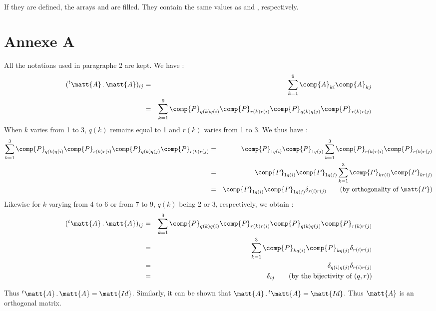 If they are defined, the arrays  and 
are filled. They contain the same values as  and
, respectively.


\section*{Annexe A}

All the notations used in paragraphe 2 are kept. We have :
\begin{eqnarray}
(^t\matt{A}\,.\,\matt{A})_{ij}
& = & \sum_{k=1}^9\comp{A}_{ki}\comp{A}_{kj}\nonumber\\
& = & \sum_{k=1}^9
\comp{P}_{q(k)q(i)}\comp{P}_{r(k)r(i)}\comp{P}_{q(k)q(j)}\comp{P}_{r(k)r(j)}
\end{eqnarray}
When $k$ varies from 1 to 3, $q(k)$ remains equal to 1 and $r(k)$ varies from 1
to 3. We thus have :
\begin{eqnarray}
\sum_{k=1}^3
\comp{P}_{q(k)q(i)}\comp{P}_{r(k)r(i)}\comp{P}_{q(k)q(j)}\comp{P}_{r(k)r(j)}
&=&\comp{P}_{1q(i)}\comp{P}_{1q(j)}\sum_{k=1}^3
\comp{P}_{r(k)r(i)}\comp{P}_{r(k)r(j)}\nonumber\\
&=&\comp{P}_{1q(i)}\comp{P}_{1q(j)}\sum_{k=1}^3
\comp{P}_{kr(i)}\comp{P}_{kr(j)}\\
&=&\comp{P}_{1q(i)}\comp{P}_{1q(j)}\delta_{r(i)r(j)}\qquad\text{(by
orthogonality of $\matt{P}$)}\nonumber
\end{eqnarray}
Likewise for $k$ varying from 4 to 6 or from 7 to 9, $q(k)$ being 2 or 3, respectively,
 we obtain :
\begin{eqnarray}
(^t\matt{A}\,.\,\matt{A})_{ij}
&=&
\sum_{k=1}^9
\comp{P}_{q(k)q(i)}\comp{P}_{r(k)r(i)}\comp{P}_{q(k)q(j)}\comp{P}_{r(k)r(j)}
\nonumber\\
&=&
\sum_{k=1}^3\comp{P}_{kq(i)}\comp{P}_{kq(j)}\delta_{r(i)r(j)}\\
&=&\delta_{q(i)q(j)}\delta_{r(i)r(j)}\nonumber\\
&=&\delta_{ij}\qquad
\text{(by the bijectivity of $(q,r)$)}\nonumber
\end{eqnarray}

Thus $^t\matt{A}\,.\,\matt{A}=\matt{Id}$. Similarly, it can be shown that
$\matt{A}\,.\,^t\matt{A}=\matt{Id}$. Thus $\matt{A}$ is an orthogonal matrix.


